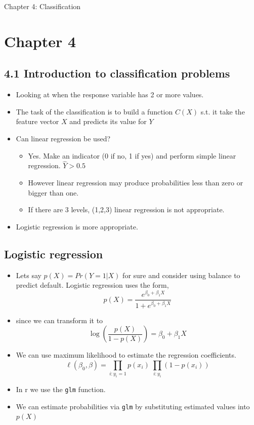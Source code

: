 \documentclass{article}
\begin{document}
\begin{center}
    \Large{Chapter 4: Classification}
\end{center}
\section{Chapter 4}

\subsection{4.1 Introduction to classification problems}

\begin{itemize}
    \item Looking at when the response variable has 2 or more values.
    \item The task of the classification is to build a function $C(X)$ s.t. it take the feature vector $X$ and predicts its value for $Y$
    \item Can linear regression be used?
    \begin{itemize}
        \item Yes. Make an indicator (0 if no, 1 if yes) and perform simple linear regression. $\hat{Y}>0.5$
        \item However linear regression may produce probabilities less than zero or bigger than one.
        \item If there are 3 levels, (1,2,3) linear regression is not appropriate.
    \end{itemize}
    \item Logistic regression is more appropriate.
\end{itemize}


\subsection{Logistic regression}
\begin{itemize}
    \item Lets say $p(X) = Pr(Y = 1|X)$ for sure and consider using balance to predict default. Logistic regression uses the form,
    \begin{equation*}
        p(X) = \frac{e^{\beta_0 + \beta_1 X}}{1 + e^{\beta_0 + \beta_1 X}}
    \end{equation*}
    \item since we can transform it to
    \begin{equation*}
        \log(\frac{p(X)}{1 - p(X)}) = \beta_0 + \beta_1 X
    \end{equation*}
    \item We can use maximum likelihood to estimate the regression coefficients.
    \begin{equation*}
        \ell(\beta_0,\beta) = \prod_{i:y_i=1} p(x_i) \; \prod_{i:y_i} (1 - p(x_i))
    \end{equation*}
    \item In r we use the \texttt{glm} function. 
    \item We can estimate probabilities via \texttt{glm} by substituting estimated values into $p(X)$
\end{itemize}
\end{document}
